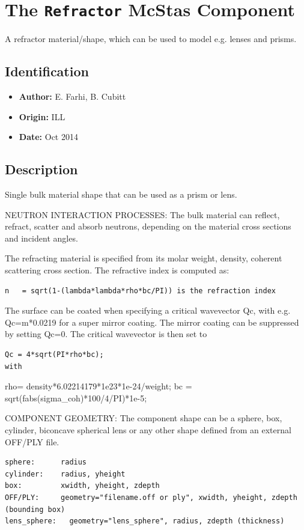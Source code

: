 \section{The \texttt{Refractor} McStas Component}
A refractor material/shape, which can be used to model e.g. lenses and prisms.

\subsection*{Identification}
\begin{itemize}
  \item \textbf{Author:} E. Farhi, B. Cubitt
  \item \textbf{Origin:} ILL
  \item \textbf{Date:} Oct 2014
\end{itemize}

\subsection*{Description}
Single bulk material shape that can be used as a prism or lens.

NEUTRON INTERACTION PROCESSES: The bulk material can reflect, refract, scatter and absorb neutrons, depending on the material cross sections and incident angles.

The refracting material is specified from its molar weight, density, coherent scattering cross section. The refractive index is computed as:

\begin{verbatim}
n   = sqrt(1-(lambda*lambda*rho*bc/PI)) is the refraction index
\end{verbatim}

The surface can be coated when specifying a critical wavevector Qc, with e.g. Qc=m*0.0219 for a super mirror coating. The mirror coating can be suppressed by setting Qc=0. The critical wavevector is then set to

\begin{verbatim}
Qc = 4*sqrt(PI*rho*bc);                                             with
\end{verbatim}

rho= density*6.02214179*1e23*1e-24/weight; bc = sqrt(fabs(sigma\_coh)*100/4/PI)*1e-5;

COMPONENT GEOMETRY: The component shape can be a sphere, box, cylinder, biconcave spherical lens or any other shape defined from an external OFF/PLY file.

\begin{verbatim}
sphere:      radius
cylinder:    radius, yheight
box:         xwidth, yheight, zdepth
OFF/PLY:     geometry="filename.off or ply", xwidth, yheight, zdepth (bounding box)
lens_sphere:   geometry="lens_sphere", radius, zdepth (thickness)
\end{verbatim}


